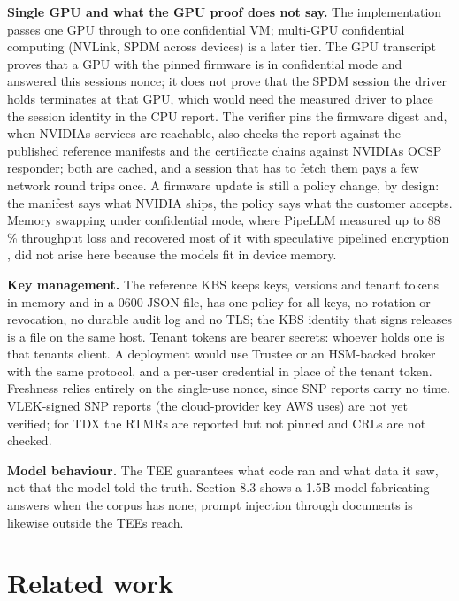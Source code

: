 \documentclass[letterpaper,twocolumn,10pt]{article}
\begin{document}
\textbf{Single GPU and what the GPU proof does not say.} The implementation passes one GPU through to one confidential VM; multi-GPU confidential computing (NVLink, SPDM across devices) is a later tier. The GPU transcript proves that a GPU with the pinned firmware is in confidential mode and answered this session\textquotesingle s nonce; it does not prove that the SPDM session the driver holds terminates at that GPU, which would need the measured driver to place the session identity in the CPU report. The verifier pins the firmware digest and, when NVIDIA\textquotesingle s services are reachable, also checks the report against the published reference manifests and the certificate chains against NVIDIA\textquotesingle s OCSP responder; both are cached, and a session that has to fetch them pays a few network round trips once. A firmware update is still a policy change, by design: the manifest says what NVIDIA ships, the policy says what the customer accepts. Memory swapping under confidential mode, where PipeLLM measured up to 88 \% throughput loss and recovered most of it with speculative pipelined encryption \cite{tan2025pipellm}, did not arise here because the models fit in device memory.

\textbf{Key management.} The reference KBS keeps keys, versions and tenant tokens in memory and in a 0600 JSON file, has one policy for all keys, no rotation or revocation, no durable audit log and no TLS; the KBS identity that signs releases is a file on the same host. Tenant tokens are bearer secrets: whoever holds one is that tenant\textquotesingle s client. A deployment would use Trustee or an HSM-backed broker with the same protocol, and a per-user credential in place of the tenant token. Freshness relies entirely on the single-use nonce, since SNP reports carry no time. VLEK-signed SNP reports (the cloud-provider key AWS uses) are not yet verified; for TDX the RTMRs are reported but not pinned and CRLs are not checked.

\textbf{Model behaviour.} The TEE guarantees what code ran and what data it saw, not that the model told the truth. Section 8.3 shows a 1.5B model fabricating answers when the corpus has none; prompt injection through documents is likewise outside the TEE\textquotesingle s reach.

\section{Related work}\label{related-work}
\end{document}
